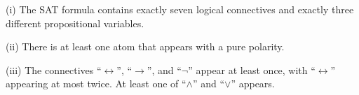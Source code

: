 \noindent(i) %
        The SAT formula contains exactly seven logical connectives 
        and exactly three different propositional variables. \smallskip

\noindent(ii)        
        There is at least one atom that appears with a pure polarity.\smallskip
        
\noindent(iii) %
        The connectives ``$\leftrightarrow$'', ``$\rightarrow$'', and ``$\lnot$'' appear at least once,
        with ``$\leftrightarrow$'' appearing at most twice.
        At least one of ``$\land$'' and ``$\lor$'' appears. \smallskip
        
        


